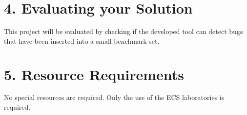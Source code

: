 \documentclass[11pt, a4paper, oneside, openright]{report}
\begin{document}
%
%
%
%

\section*{4. Evaluating your Solution}

This project will be evaluated by checking if the developed tool can detect bugs that have been inserted into a small benchmark set.


\section*{5. Resource Requirements}

No special resources are required. Only the use of the ECS laboratories is required.





%

\end{document}
